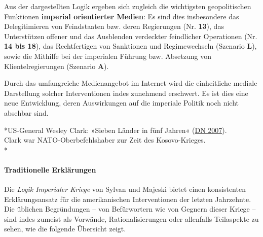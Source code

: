 Aus der dargestellten Logik ergeben sich zugleich die wichtigsten
geopolitischen Funktionen \textbf{imperial orientierter Medien}: Es sind
dies insbesondere das Delegitimieren von Feindstaaten bzw. deren
Regierungen (Nr. \textbf{13}), das Unterstützen offener und das
Ausblenden verdeckter feindlicher Operationen (Nr. \textbf{14 bis 18}),
das Rechtfertigen von Sanktionen und Regimewechseln (Szenario
\textbf{L}), sowie die Mithilfe bei der imperialen Führung bzw.
Absetzung von Klientelregierungen (Szenario \textbf{A}).

Durch das umfangreiche Medienangebot im Internet wird die einheitliche
mediale Darstellung solcher Interventionen indes zunehmend erschwert. Es
ist dies eine neue Entwicklung, deren Auswirkungen auf die imperiale
Politik noch nicht absehbar sind.

*US-General Wesley Clark: »Sieben Länder in fünf Jahren«
(\href{https://www.democracynow.org/2007/3/2/gen_wesley_clark_weighs_presidential_bid}{DN
2007}).\\
Clark war NATO-Oberbefehlshaber zur Zeit des Kosovo-Krieges.\\
*

\hypertarget{traditionelle-erkluxe4rungen}{%
\paragraph{Traditionelle
Erklärungen}\label{traditionelle-erkluxe4rungen}}

Die \emph{Logik Imperialer Kriege} von Sylvan und Majeski bietet einen
konsistenten Erklärungsansatz für die amerikanischen Interventionen der
letzten Jahrzehnte. Die üblichen Begründungen -- von Befürwortern wie
von Gegnern dieser Kriege -- sind indes zumeist als Vorwände,
Rationalisierungen oder allenfalls Teilaspekte zu sehen, wie die
folgende Übersicht zeigt.

